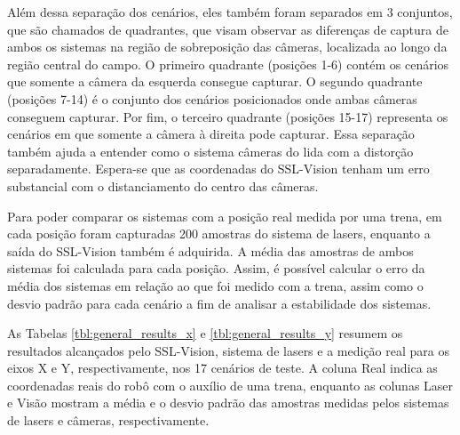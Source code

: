 \documentclass[acronym, symbols, table]{fei}
\begin{document}
				Além dessa separação dos cenários, eles também foram separados em 3 conjuntos, que são chamados de quadrantes, que visam observar as diferenças de captura de ambos os sistemas na região de sobreposição das câmeras, localizada ao longo da região central do campo. O primeiro quadrante (posições 1-6) contém os cenários que somente a câmera da esquerda consegue capturar. O segundo quadrante (posições 7-14) é o conjunto dos cenários posicionados onde ambas câmeras conseguem capturar. Por fim, o terceiro quadrante (posições 15-17) representa os cenários em que somente a câmera à direita pode capturar. Essa separação também ajuda a entender como o sistema câmeras do  lida com a distorção separadamente. Espera-se que as coordenadas do SSL-Vision tenham um erro substancial com o distanciamento do centro das câmeras.
				
				Para poder comparar os sistemas com a posição real medida por uma trena, em cada posição foram capturadas 200 amostras do sistema de lasers, enquanto a saída do SSL-Vision também é adquirida. A média das amostras de ambos sistemas foi calculada para cada posição. Assim, é possível calcular o erro da média dos sistemas em relação ao que foi medido com a trena, assim como o desvio padrão para cada cenário a fim de analisar a estabilidade dos sistemas.
				
				As Tabelas \ref{tbl:general_results_x} e \ref{tbl:general_results_y} resumem os resultados alcançados pelo SSL-Vision, sistema de lasers e a medição real para os eixos X e Y, respectivamente, nos 17 cenários de teste. A coluna Real indica as coordenadas reais do robô com o auxílio de uma trena, enquanto as colunas Laser e Visão mostram a média e o desvio padrão das amostras medidas pelos sistemas de lasers e câmeras, respectivamente.
				
\end{document}
